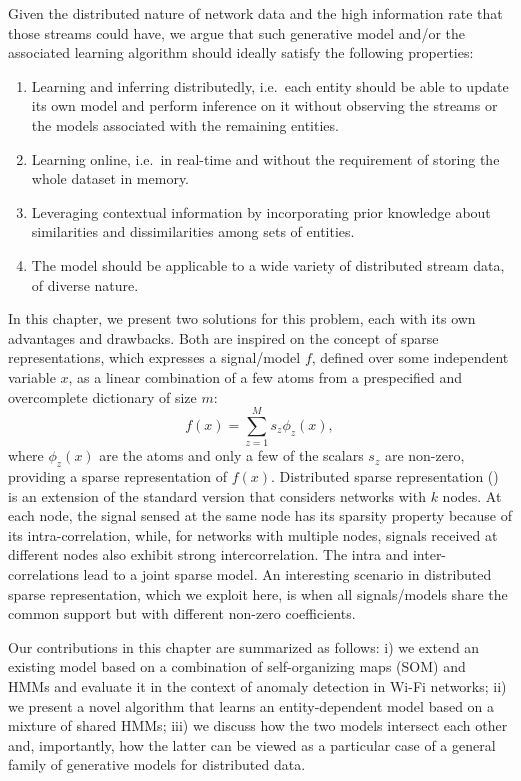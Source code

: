 Given the distributed nature of network data and the high information rate that those streams could have, we argue that such generative model and/or the associated learning algorithm should ideally satisfy the following properties:
\begin{enumerate}
	\item Learning and inferring distributedly, i.e.\ each entity should be able to update its own model and perform inference on it without observing the streams or the models associated with the remaining entities.
	\item Learning online, i.e.\ in real-time and without the requirement of storing the whole dataset in memory.
	\item Leveraging contextual information by incorporating prior knowledge about similarities and dissimilarities among sets of entities.
	\item The model should be applicable to a wide variety of distributed stream data, of diverse nature.
\end{enumerate}
In this chapter, we present two solutions for this problem, each with its own advantages and drawbacks. Both are inspired on the concept of sparse representations, which expresses a signal/model $f$, defined over some independent variable $x$, as a linear combination of a few atoms from a prespecified and overcomplete dictionary of size $m$:
\begin{equation}
\label{eq:sparse_coding}
f(x)=\sum_{z=1}^M s_z \phi_z(x),
\end{equation}
where $\phi_z(x)$ are the atoms and only a few of the scalars $s_z$ are non-zero, providing a sparse representation of $f(x)$.  Distributed sparse representation (\citet{Baron}) is an extension of the standard version that considers networks with $k$ nodes. At each node, the signal sensed at the same node has its sparsity property because of its intra-correlation, while, for networks with multiple nodes, signals received at different nodes also exhibit strong intercorrelation.
The intra and inter-correlations lead to a joint sparse model. An interesting scenario in distributed sparse representation, which we exploit here, is when all signals/models share the common support but with different non-zero coefficients.

Our contributions in this chapter are summarized as follows: i) we extend an existing model based on a combination of self-organizing maps (SOM) and HMMs and evaluate it in the context of anomaly detection in Wi-Fi networks; ii) we present a novel algorithm that learns an entity-dependent model based on a mixture of shared HMMs; iii) we discuss how the two models intersect each other and, importantly, how the latter can be viewed as a particular case of a general family of generative models for distributed data.

